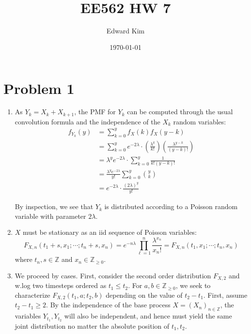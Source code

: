 \documentclass[12pt]{article}%
\title{EE562 HW 7}
\author{Edward Kim}
\date{\today}
\begin{document}
\maketitle

\section{Problem 1}
\label{sec:prob_one}

\begin{enumerate}
  \item As $Y_{{k}} = X_{{k}} + X_{k+1}$, the PMF for $Y_k$ can be computed through the usual convolution formula and the independence of the $X_k$ random variables:
        \begin{align*}
          f_{Y_k}(y) & = \sum_{k = 0}^y f_X(k)f_X(y-k) \\
                     & = \sum_{k = 0}^y e^{{-2\lambda}} \cdot \left(\frac{\lambda^{k}}{k!}\right)\left(\frac{\lambda^{y-k}}{(y-k)!}\right) \\
                     & = \lambda^{y}e^{-2\lambda} \cdot \sum_{k = 0}^y \frac{1}{k!(y-k)!} \\
                     & = \frac{\lambda^{y}e^{-2\lambda}}{y!} \sum_{k=0}^y \binom{y}{k} \\
           & = e^{-2\lambda} \cdot \frac{(2\lambda)^y}{y!}
        \end{align*}

        By inspection, we see that $Y_k$ is distributed according to a Poisson random variable with parameter $2\lambda$.
  \item
        $X$ must be stationary as an iid sequence of Poisson variables:
        \[ F_{X,n}(t_1+s,x_1;\cdots;t_n+s,x_n) = e^{-n\lambda}\prod_{\ell = 1}^n \frac{\lambda^{x_{n}}}{x_{n}!} =  F_{X,n}(t_1,x_1;\cdots;t_n,x_n)\]
        where $t_{n},s \in \mathbb{Z}$ and $x_{n} \in \mathbb{Z}_{\geq 0}$.

  \item
        We proceed by cases. First, consider the second order distribution $F_{X,2}$ and w.log two timesteps ordered as $t_1\leq t_2$. For $a,b \in \mathbb{Z}_{\geq 0 }$, we seek to characterize $F_{X,2}(t_1,a;t_2,b)$ depending on the value of $t_{2}- t_{1}$. First, assume $t_{2} - t_{1} \geq 2$. By the independence of the base process $X =(X_n)_{n \in \mathbb{Z}}$, the variables $Y_{t_{1}}, Y_{t_2}$ will also be independent, and hence must yield the same joint distribution no matter the absolute position of $t_1,t_2$.


\end{enumerate}
\end{document}
